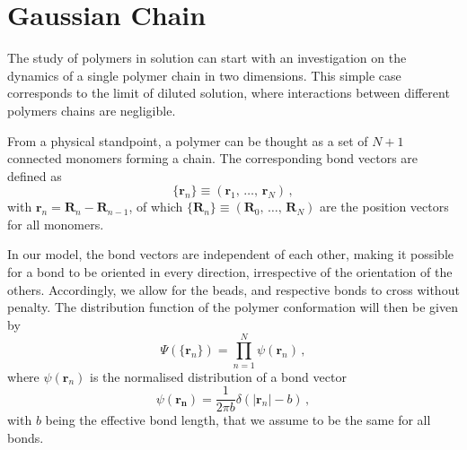\documentclass[../../main.tex]{subfiles}
\begin{document}
%
\section{Gaussian Chain}\label{ch: Gaussian Chain}
    
    The study of polymers in solution can start with an investigation on the dynamics of a single polymer chain in two dimensions. This simple case corresponds to the limit of diluted solution, where interactions between different polymers chains are negligible. 
    
    From a physical standpoint, a polymer can be thought as a set of $N+1$ connected monomers forming a chain. The corresponding bond vectors are defined as
        \begin{equation}\label{eq: Gaussian Chain - Bond Vector Definition}
            \{\mathbf{r}_n\}\equiv(\mathbf{r}_1, \,\ldots,\, \mathbf{r}_N) \,,
        \end{equation}
    with $\mathbf{r}_n = \mathbf{R}_n - \mathbf{R}_{n-1}$, of which $\{\mathbf{R}_n\} \equiv (\mathbf{R}_0, \,\ldots,\, \mathbf{R}_N)$ are the position vectors for all monomers.
    
    In our model, the bond vectors are independent of each other, making it possible for a bond to be oriented in every direction, irrespective of the orientation of the others. Accordingly, we allow for the beads, and respective bonds to cross without penalty. The distribution function of the polymer conformation will then be given by
        \begin{equation}\label{eq: Gaussian Chain - Distribution function of the polymer conformation (I)}
            \Psi(\{\mathbf{r}_n\}) = \prod_{n=1}^N \psi(\mathbf{r}_n) \,,
        \end{equation}
    where $\psi(\mathbf{r}_n)$ is the normalised distribution of a bond vector
        \begin{equation}\label{eq: Gaussian Chain - Normalised distribution of a random bond vector}
            \psi(\mathbf{r_n}) = \frac{1}{2\pi b}\delta(\lvert\mathbf{r}_n\rvert - b) \,,
        \end{equation}
    with $b$ being the effective bond length, that we assume to be the same for all bonds. %
\end{document}
